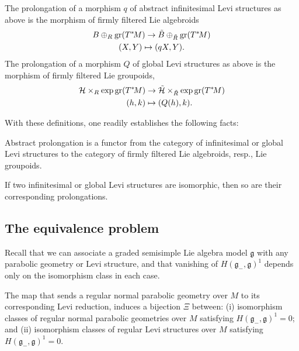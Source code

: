 \documentclass[leqno,12pt]{amsart} %
\begin{document}
The {\df prolongation} of a morphism $q$ of abstract infinitesimal Levi
structures as above is the morphism of firmly filtered Lie algebroids
\begin{gather*}
  B \oplus_R \operatorname{\operatorname{gr}}(T^*\!M) \rightarrow \tilde B \oplus_{\tilde R} \operatorname{\operatorname{gr}}(T^*\!M)\\
  (X, Y) \mapsto (qX, Y).
\end{gather*}
The {\df prolongation} of a morphism $Q$ of global Levi structures as above is
the morphism of firmly filtered Lie groupoids,
\begin{align*}
  {\mathcal H} \times _R \exp\operatorname{\operatorname{gr}}(T^*\!M)
  &\rightarrow \tilde {\mathcal H}  \times_{\tilde R} \exp \operatorname{\operatorname{gr}} (T^*\!M)\\
  (h, k) &\mapsto  (Q(h), k).
\end{align*}

With these definitions, one readily establishes the following facts:
\begin{proposition}
  Abstract prolongation is a functor from the category of infinitesimal or global
  Levi structures to the category of firmly filtered Lie algebroids, resp., Lie
  groupoids.
\end{proposition}

\begin{corollary}
  If two infinitesimal or global Levi structures are isomorphic, then so are their
  corresponding prolongations.
\end{corollary}

\subsection{The equivalence problem}\label{equivalence_}

Recall that we can associate a graded semisimple Lie algebra model ${\mathfrak g} $ with
any parabolic geometry or Levi structure, and that vanishing of
$H({\mathfrak g}_-, {\mathfrak g})^1$ depends only on the isomorphism class in each case.

\begin{theorem}[Equivalence]
  The map that sends a regular normal parabolic geometry over $M$ to its corresponding
  Levi reduction, induces a bijection $\Xi$ between: (i) isomorphism classes of regular
  normal parabolic geometries over $M$ satisfying
  $H({\mathfrak g}_-, {\mathfrak g})^1 = 0$; and (ii) isomorphism classes of regular Levi
  structures over $M$ satisfying $H({\mathfrak g}_-, {\mathfrak g})^1 = 0$.
\end{theorem}
\end{document}
